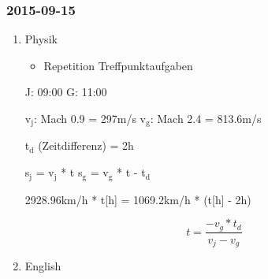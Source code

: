 \documentclass[11pt]{article}
\begin{document}
\subsubsection{2015-09-15}
\label{sec-1-2-5}
\begin{enumerate}
\item Physik
\label{sec-1-2-5-1}
\begin{itemize}
\item Repetition Treffpunktaufgaben
\end{itemize}
J: 09:00
G: 11:00

v$_{\text{j}}$: Mach 0.9 = 297m/s
v$_{\text{g}}$: Mach 2.4 = 813.6m/s

t$_{\text{d}}$ (Zeitdifferenz) = 2h

s$_{\text{j}}$ = v$_{\text{j}}$ * t
s$_{\text{g}}$ = v$_{\text{g}}$ * t - t$_{\text{d}}$


2928.96km/h * t[h] = 1069.2km/h * (t[h] - 2h)


\begin{equation}
t = \frac{-v_g * t_d}{v_j - v_g} 
\end{equation} 
\item English
\label{sec-1-2-5-2}
\end{enumerate}
\end{document}
